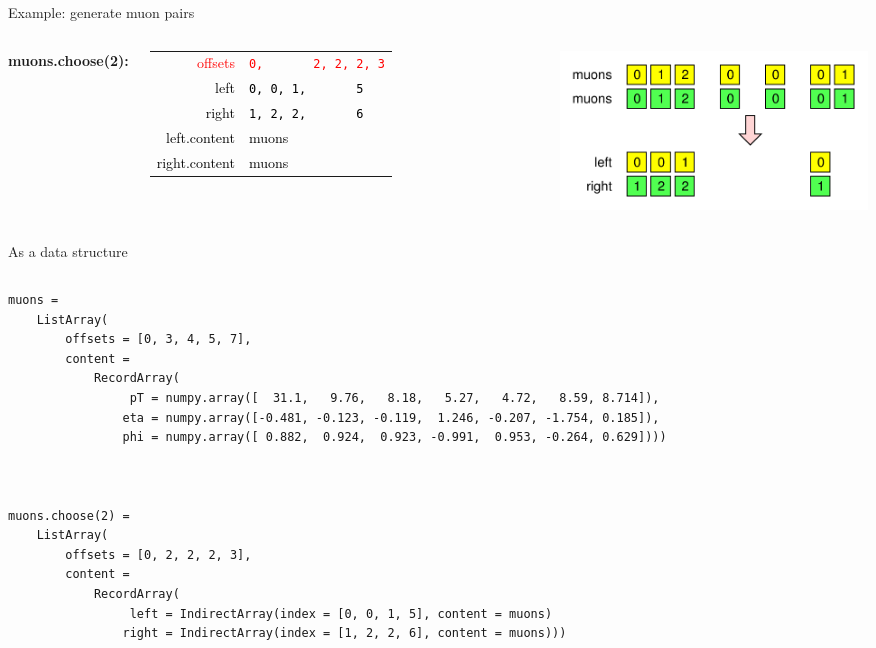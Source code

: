 \documentclass[aspectratio=169]{beamer}
\begin{document}
\begin{frame}{Example: generate muon pairs}
\begin{columns}
\vspace{0.75 cm}
{\large\bf muons.choose(2):}

\vspace{0.2 cm}
\begin{tabular}{r l}
\textcolor{red}{offsets} &   \textcolor{red}{\tt 0,\ \ \ \ \ \ \ 2,\ 2,\ 2,\ 3} \\
\textcolor{black}{left}  & \textcolor{black}{\tt 0,\ 0,\ 1,\ \ \ \ \ \ \ 5} \\
\textcolor{black}{right} & \textcolor{black}{\tt 1,\ 2,\ 2,\ \ \ \ \ \ \ 6} \\
\textcolor{black}{left.content}  & \textcolor{black}{muons} \\
\textcolor{black}{right.content} & \textcolor{black}{muons} \\
\end{tabular}

\vspace{-3.2 cm}
\hfill\includegraphics[height=3.5 cm]{muons-choose-2.pdf}

\end{columns}
\end{frame}

\begin{frame}[fragile]{As a data structure}
\vspace{0.25 cm}
\begin{columns}
\scriptsize
\begin{verbatim}
muons =
    ListArray(
        offsets = [0, 3, 4, 5, 7],
        content =
            RecordArray(
                 pT = numpy.array([  31.1,   9.76,   8.18,   5.27,   4.72,   8.59, 8.714]),
                eta = numpy.array([-0.481, -0.123, -0.119,  1.246, -0.207, -1.754, 0.185]),
                phi = numpy.array([ 0.882,  0.924,  0.923, -0.991,  0.953, -0.264, 0.629])))



muons.choose(2) =
    ListArray(
        offsets = [0, 2, 2, 2, 3],
        content =
            RecordArray(
                 left = IndirectArray(index = [0, 0, 1, 5], content = muons)
                right = IndirectArray(index = [1, 2, 2, 6], content = muons)))
\end{verbatim}
\end{columns}
\end{frame}


\begin{frame}{}
\end{frame}
\end{document}
